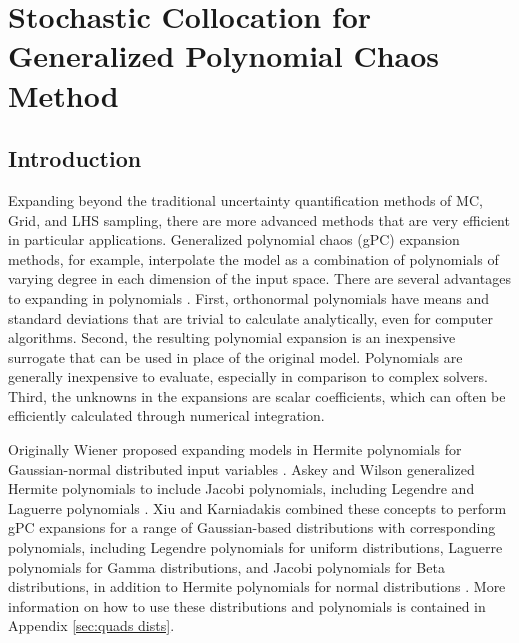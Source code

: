 
\chapter{Stochastic Collocation for Generalized Polynomial Chaos Method} %

\label{ch:methods scgpc} %



\section{Introduction}
Expanding beyond the traditional uncertainty quantification methods of MC, Grid, and LHS sampling, there are more
advanced methods that are very efficient in particular applications.
Generalized polynomial chaos (gPC) expansion methods, for example, interpolate the model as a combination of
polynomials of varying degree in each dimension of the input space.  There are several advantages to expanding
in polynomials \cite{xiu}.  First, orthonormal polynomials have means and standard deviations that are trivial to calculate
analytically, even for computer algorithms.  Second, the resulting polynomial expansion is an
inexpensive surrogate that can be used in place of the original model.  Polynomials are generally inexpensive
to evaluate, especially in comparison to complex solvers.  Third, the unknowns in the expansions
are scalar coefficients, which can often be efficiently calculated through numerical integration.

Originally Wiener
proposed expanding models in Hermite polynomials for Gaussian-normal distributed input variables \cite{wiener}.  Askey and
Wilson generalized Hermite polynomials to include Jacobi polynomials, including Legendre and Laguerre
polynomials \cite{Wiener-Askey}.  Xiu and Karniadakis combined these concepts to perform gPC expansions for a 
range of Gaussian-based distributions with corresponding polynomials,
including Legendre polynomials for uniform distributions, Laguerre polynomials for Gamma distributions, and
Jacobi polynomials for Beta distributions, in addition to Hermite polynomials for normal distributions
\cite{xiu}.  More information on how to use these distributions and polynomials is contained in Appendix
\ref{sec:quads dists}.

